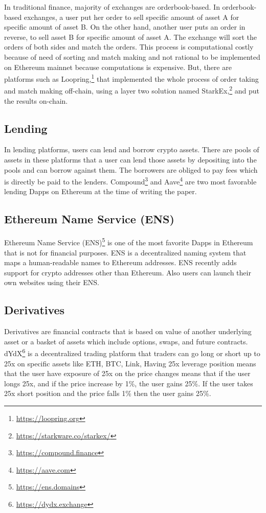 In traditional finance, majority of exchanges are orderbook-based. In orderbook-based exchanges, a user put her order to sell specific amount of asset A for specific amount of asset B. On the other hand, another user puts an order in reverse, to sell asset B for specific amount of asset A. The exchange will sort the orders of both sides and match the orders. This process is computational costly because of need of sorting and match making and not rational to be implemented on Ethereum mainnet because computations is expensive. But, there are platforms such as Loopring,\footnote{\url{https://loopring.org}} that implemented the whole process of order taking and match making off-chain, using a layer two solution named StarkEx,\footnote{\url{https://starkware.co/starkex/}} and put the results on-chain.

\subsection{Lending}
In lending platforms, users can lend and borrow crypto assets. There are pools of assets in these platforms that a user can lend those assets by depositing into the pools and can borrow against them. The borrowers are obliged to pay fees which is directly be paid to the lenders. Compound\footnote{\url{https://compound.finance}} and Aave\footnote{\url{https://aave.com}} are two most favorable lending Dapps on Ethereum at the time of writing the paper. 

\subsection{Ethereum Name Service (ENS)}
Ethereum Name Service (ENS)\footnote{\url{https://ens.domains}} is one of the most favorite Dapps in Ethereum that is not for financial purposes. ENS is a decentralized naming system that maps a human-readable names to Ethereum addresses. 
ENS recently adds support for crypto addresses other than Ethereum. Also users can launch their own websites using their ENS.

\subsection{Derivatives}
Derivatives are financial contracts that is based on value of another underlying asset or a basket of assets which include options, swaps, and future contracts. dYdX\footnote{\url{https://dydx.exchange}} is a decentralized trading platform that traders can go long or short up to 25x on specific assets like ETH, BTC, Link, \etc
Having 25x leverage position means that the user have exposure of 25x on the price changes means that if the user longs 25x, and if the price increase by 1\%, the user gains 25\%. If the user takes 25x short position and the price falls 1\% then the user gains 25\%.

